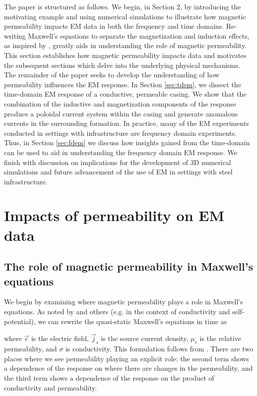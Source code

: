 \documentclass[onecolumn, extra, mreferee]{gji}
\begin{document}
The paper is structured as follows. We begin, in Section 2,  by introducing the motivating example and using numerical simulations to illustrate how magnetic permeability impacts EM data in both the frequency and time domains. Re-writing Maxwell's equations to separate the magnetization and induction effects, as inspired by \cite{Pavlov2001, kaufman_principles_2009, Noh2016}, greatly aids in understanding the role of magnetic permeability. This section establishes how magnetic permeability impacts data and  motivates the subsequent sections which delve into the underlying physical mechanisms. The remainder of the paper seeks to develop the understanding of how permeability influences the EM response. In Section \ref{sec:tdem}, we dissect the time-domain EM response of a conductive, permeable casing. We show that the combination of the inductive and magnetization components of the response produce a poloidal current system within the casing and generate anomalous currents in the surrounding formation. In practice, many of the EM experiments conducted in settings with infrastructure are frequency domain experiments. Thus, in Section \ref{sec:fdem} we discuss how insights gained from the time-domain can be used to aid in understanding the frequency domain EM response. We finish with discussion on implications for the development of 3D numerical simulations and future advancement of the use of EM in settings with steel infrastructure.

\section{Impacts of permeability on EM data}
\label{sec:setup}
\subsection{The role of magnetic permeability in Maxwell's equations}
We begin by examining where magnetic permeability plays a role in Maxwell's equations. As noted by \cite{Ward1988, Pavlov2001, Noh2016} and others (e.g. \cite{revil_self-potential_2013} in the context of conductivity and self-potential), we can rewrite the quasi-static Maxwell's equations in time as

where $\vec{e}$ is the electric field, $\vec{j}_s$ is the source current density, $\mu_r$ is the relative permeability, and $\sigma$ is conductivity. This formulation follows from \citep{Pavlov2001}. There are two places where we see permeability playing an explicit role: the second term shows a dependence of the response on where there are changes in the permeability, and the third term shows a dependence of the response on the product of conductivity and permeability.
\end{document}
